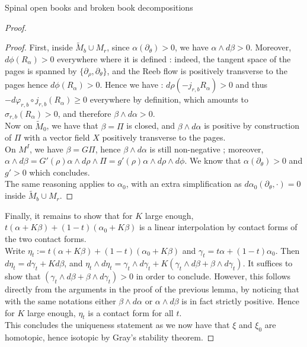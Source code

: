 \documentclass[../main.tex]{subfiles}
\begin{document}
\begin{section}{Spinal open books and broken book decompositions}
\begin{proof}
\begin{proof}
First, inside $\tilde M_b\cup M_r$, since $\alpha(\partial_\theta)> 0$, we have $\alpha\wedge d\beta > 0$. Moreover, $d\phi(R_\alpha)> 0$ everywhere where it is defined : indeed, the tangent space of the pages is spanned by $\{\partial_\rho,\partial_\theta\}$, and the Reeb flow is positively transverse to the pages hence $d\phi(R_\alpha)>0$. Hence we have : $d\rho(-j_{r,b}R_\alpha)> 0$ and thus $-d\varphi_{r,b}\circ j_{r,b}(R_\alpha)\geq 0$ everywhere by definition, which amounts to $\sigma_{r,b}(R_\alpha)>0$, and therefore $\beta\wedge d\alpha>0$. \\

Now on $\tilde M_0$, we have that $\beta = \Pi$ is closed, and $\beta\wedge d\alpha$ is positive by construction of $\Pi$ with a vector field $X$ positively transverse to the pages. \\

On $M^I$, we have $\beta = G\Pi$, hence $\beta\wedge d\alpha$ is still non-negative ;  moreover, $\alpha\wedge d\beta = G'(\rho)\alpha\wedge d\rho\wedge \Pi = g'(\rho)\alpha\wedge d\rho\wedge d\phi$. We know that $\alpha(\partial_\theta) > 0$ and $g'>0$ which concludes. \\

The same reasoning applies to $\alpha_0$, with an extra simplification as $d\alpha_0(\partial_\theta,\cdot) = 0$ inside $\tilde M_b\cup M_r$.
\end{proof}

Finally, it remains to show that for $K$ large enough, $t(\alpha + K\beta) + (1-t) (\alpha_0 + K\beta)$ is a linear interpolation by contact forms of the two contact forms.\\

Write $\eta_t := t(\alpha + K\beta) + (1-t) (\alpha_0 + K\beta)$ and $\gamma_t = t\alpha + (1-t)\alpha_0$. Then $d\eta_t = d\gamma_t +Kd\beta$, and $\eta_t\wedge d\eta_t = \gamma_t\wedge d\gamma_t + K(\gamma_t\wedge d\beta + \beta\wedge d\gamma_t)$. It suffices to show that $(\gamma_t\wedge d\beta +\beta\wedge d\gamma_t)> 0$ in order to conclude. However, this follows directly from the arguments in the proof of the previous lemma, by noticing that with the same notations either $\beta\wedge d\alpha$ or $\alpha\wedge d\beta$ is in fact strictly positive. Hence for $K $ large enough, $\eta_t$ is a contact form for all $t$.\\

This concludes the uniqueness statement as we now have that $\xi$ and $\xi_0$ are homotopic, hence isotopic by Gray's stability theorem.


\end{proof}
\end{section}
\end{document}
